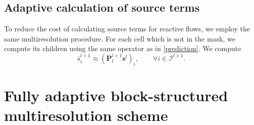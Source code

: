 \documentclass[]{article}
\begin{document}
    \subsection{Adaptive calculation of source terms}

        To reduce the cost of calculating source terms for reactive flows, we employ
        the same multiresolution procedure. For each cell which is not in the mask,
        we compute its children using the same operator as in \ref{prediction}.
        We compute
        \begin{equation}
            \overline{s}_{i}^{l+1} \approx \left( \bm{P}_{l}^{l+1} \bm{s}^{l}
                \right)_{i}, \text{ } \text{ } \text{ } \forall i \in
                \bm{\mathcal{I}}^{l+1}.
        \end{equation}

\section{Fully adaptive block-structured multiresolution scheme}

\end{document}
